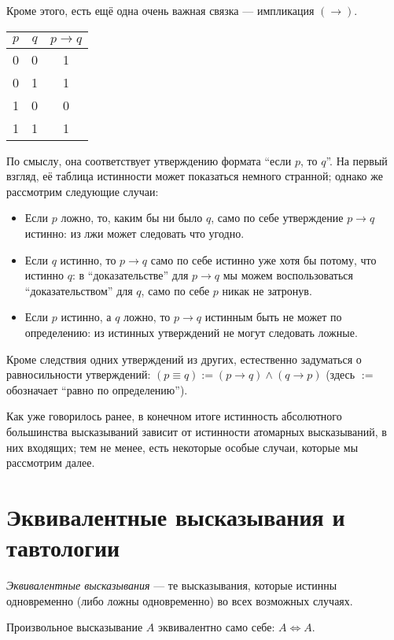 Кроме этого, есть ещё одна очень важная связка --- импликация $(\to)$.
\begin{center}
\begin{tabular}{cc|c}
  $p$&$q$&$p\to q$\\
  \hline
  0&0&1\\
  0&1&1\\
  1&0&0\\
  1&1&1
\end{tabular}
\end{center}

По смыслу, она соответствует утверждению формата ``если $p$, то $q$''. На первый
взгляд, её таблица истинности может показаться немного странной; однако же
рассмотрим следующие случаи:
\begin{itemize}
  \item Если $p$ ложно, то, каким бы ни было $q$, само по себе утверждение
    $p\to q$ истинно: из лжи может следовать что угодно.
  \item Если $q$ истинно, то $p \to q$ само по себе истинно уже хотя бы потому,
    что истинно $q$: в ``доказательстве'' для $p \to q$ мы можем воспользоваться
    ``доказательством'' для $q$, само по себе $p$ никак не затронув.
  \item Если $p$ истинно, а $q$ ложно, то $p \to q$ истинным быть не может по
    определению: из истинных утверждений не могут следовать ложные.
\end{itemize}

Кроме следствия одних утверждений из других, естественно задуматься о
равносильности утверждений: $(p\equiv q):=(p\to q)\land(q\to p)$ (здесь $:=$
обозначает ``равно по определению'').

Как уже говорилось ранее, в конечном итоге истинность абсолютного большинства
высказываний зависит от истинности атомарных высказываний, в них входящих; тем
не менее, есть некоторые особые случаи, которые мы рассмотрим далее.

\section{Эквивалентные высказывания и тавтологии}

\begin{defn}
  \textit{Эквивалентные высказывания} --- те высказывания, которые истинны
  одновременно (либо ложны одновременно) во всех возможных случаях.
\end{defn}

\begin{ex}
  Произвольное высказывание $A$ эквивалентно само себе: $A\Leftrightarrow A$.
\end{ex}

